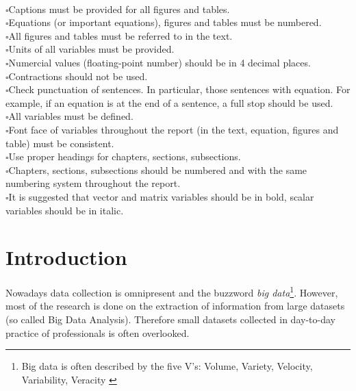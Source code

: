 \\$\square${Captions must be provided for all figures and tables.}
\\$\square${Equations (or important equations), figures and tables must be numbered.}
\\$\square${All figures and tables must be referred to in the text.}
\\$\square${Units of all variables must be provided.}
\\$\square${Numercial values (floating-point number) should be in 4 decimal places.}
\\$\square${Contractions should not be used.}
\\$\square${Check punctuation of sentences.  In particular, those sentences with equation.  For example, if an equation is at the end of a sentence, a full stop should be used.}
\\$\square${All variables must be defined.}
\\$\square${Font face of variables throughout the report (in the text, equation, figures and table) must be consistent.}
\\$\square${Use proper headings for chapters, sections, subsections.}
\\$\square${Chapters, sections, subsections should be numbered and with the same numbering system throughout the report.}
\\$\square${It is suggested that vector and matrix variables should be in bold, scalar variables should be in italic.}

\section{Introduction}


Nowadays data collection is omnipresent and the buzzword \textit{big data}\footnote{Big data is often described by the five V's: Volume, Variety, Velocity, Variability, Veracity \cite{Hilbert2015}}. However, most of the research is done on the extraction of information from large datasets (so called Big Data Analysis). Therefore small datasets collected in day-to-day practice of professionals is often overlooked. 

